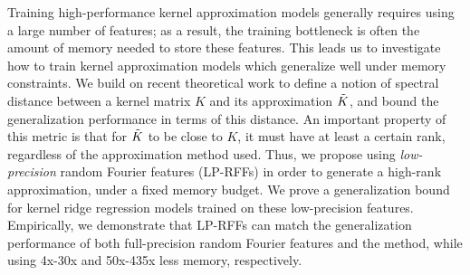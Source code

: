 
Training high-performance kernel approximation models generally requires using a large number of features; as a result, the training bottleneck is often the amount of memory needed to store these features. This leads us to investigate how to train kernel approximation models which generalize well under memory constraints. We build on recent theoretical work \citep{avron17,musco17} to define a notion of spectral distance between a kernel matrix $K$ and its approximation $\tilde{K}$, and bound the generalization performance in terms of this distance. An important property of this metric is that for $\tilde{K}$ to be close to $K$, it must have at least a certain rank, regardless of the approximation method used. Thus, we propose using \emph{low-precision} random Fourier features (LP-RFFs) in order to generate a high-rank approximation, under a fixed memory budget. We prove a generalization bound for kernel ridge regression models trained on these low-precision features.  Empirically, we demonstrate that LP-RFFs can match the generalization performance of both full-precision random Fourier features and the \Nystrom method, while using 4x-30x and 50x-435x less memory, respectively.


